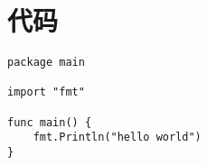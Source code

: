 \chapter{代码}
\vspace{0.5cm}

\begin{lstlisting}
package main

import "fmt"

func main() {
    fmt.Println("hello world")
}
\end{lstlisting}
